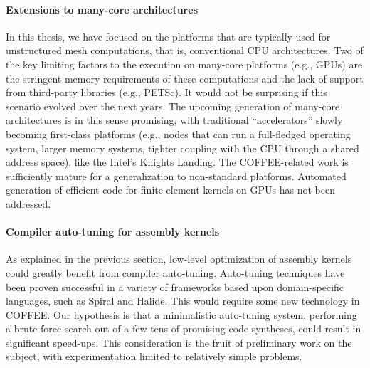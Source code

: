 \paragraph{Extensions to many-core architectures}
In this thesis, we have focused on the platforms that are typically used for unstructured mesh computations, that is, conventional CPU architectures. Two of the key limiting factors to the execution on many-core platforms (e.g., GPUs) are the stringent memory requirements of these computations and the lack of support from third-party libraries (e.g., PETSc). It would not be surprising if this scenario evolved over the next years. The upcoming generation of many-core architectures is in this sense promising, with traditional ``accelerators'' slowly becoming first-class platforms (e.g., nodes that can run a full-fledged operating system, larger memory systems, tighter coupling with the CPU through a shared address space), like the Intel's Knights Landing. The COFFEE-related work is sufficiently mature for a generalization to non-standard platforms. Automated generation of efficient code for finite element kernels on GPUs has not been addressed.

\paragraph{Compiler auto-tuning for assembly kernels}
As explained in the previous section, low-level optimization of assembly kernels could greatly benefit from compiler auto-tuning. Auto-tuning techniques have been proven successful in a variety of frameworks based upon domain-specific languages, such as Spiral and Halide. This would require some new technology in COFFEE. Our hypothesis is that a minimalistic auto-tuning system, performing a brute-force search out of a few tens of promising code syntheses, could result in significant speed-ups. This consideration is the fruit of preliminary work on the subject, with experimentation limited to relatively simple problems.

